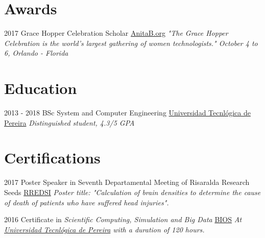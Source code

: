 \documentclass[]{friggeri-cv}
\begin{document}


\section{Awards}

\begin{entrylist}
    \entry
    {2017}
    {Grace Hopper Celebration Scholar}
    {\href{https://ghc.anitab.org/}{AnitaB.org}}
    {\emph{\textit{"The Grace Hopper Celebration is the world's largest gathering of women technologists."} 
    October 4 to 6, Orlando - Florida}}
\end{entrylist}


\section{Education}

\begin{entrylist}
  \entry
    {2013 - 2018}
    {BSc {\normalfont System and Computer Engineering}}
    {\href{http://www.utp.edu.co/}{Universidad Tecnlógica de Pereira}}
    {\emph{Distinguished student, 4.3/5 GPA}}
\end{entrylist}


\section{Certifications}

\begin{entrylist}

    \entry
    {2017}
    {Poster Speaker in Seventh Departamental Meeting of Risaralda Research Seeds}
    {\href{http://www.rredsi.co/}{RREDSI}}
    {\emph{Poster title: \textit{"Calculation of brain densities to determine the cause of death of patients who have suffered head injuries"}.}}
    
    \entry
    {2016}
    {Certificate in \textit{Scientific Computing, Simulation and Big Data}}
    {\href{http://bios.org.co/es-es/}{BIOS}}
    {\emph{At {\href{http://www.utp.edu.co/}{Universidad Tecnlógica de Pereira}} with a duration of 120 hours.}}
    
\end{entrylist}
\end{document}
